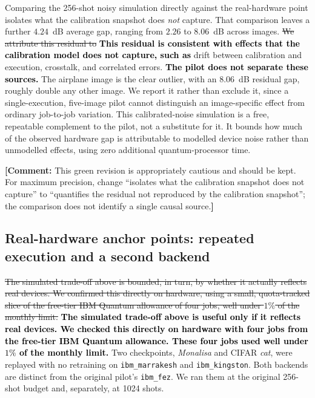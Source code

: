 \documentclass[pdflatex,sn-basic]{sn-jnl}
\newcommand{\del}[1]{\sout{#1}}
\newcommand{\add}[1]{\textbf{\textcolor{black}{#1}}}
\newcommand{\yellowcomment}[1]{%
  \par\smallskip\noindent
  \begingroup\setlength{\fboxsep}{3pt}%
  \colorbox{yellow!35}{\parbox{\dimexpr\linewidth-2\fboxsep\relax}{\textbf{[Comment:} #1\textbf{]}}}%
  \endgroup\par\smallskip}
\begin{document}
Comparing the 256-shot noisy simulation directly against the real-hardware point
isolates what the calibration snapshot does \emph{not} capture. That comparison
leaves a further $4.24$~dB average gap, ranging from $2.26$ to $8.06$~dB across
images. \del{We attribute this residual to} \add{This residual is consistent
with effects that the calibration model does not capture, such as} drift between calibration and execution,
crosstalk, and correlated errors. \add{The pilot does not separate these
sources.} The airplane image is the clear outlier, with
an $8.06$~dB residual gap, roughly double any other image. We report it rather
than exclude it, since a single-execution, five-image pilot cannot distinguish an
image-specific effect from ordinary job-to-job variation. This calibrated-noise
simulation is a free, repeatable complement to the pilot, not a substitute for
it. It bounds how much of the observed hardware gap is attributable to modelled
device noise rather than unmodelled effects, using zero additional
quantum-processor time.
\color{black}
\yellowcomment{This green revision is appropriately cautious and should be kept. For maximum precision, change ``isolates what the calibration snapshot does not capture'' to ``quantifies the residual not reproduced by the calibration snapshot''; the comparison does not identify a single causal source.}


\subsection{Real-hardware anchor points: repeated execution and a second backend}
\label{sec:hardware_anchors}

\del{The simulated trade-off above is bounded, in turn, by whether it actually
reflects real devices. We confirmed this directly on hardware, using a small,
quota-tracked slice of the free-tier IBM Quantum allowance of four jobs, well
under $1\%$ of the monthly limit.} \add{The simulated trade-off above is useful
only if it reflects real devices. We checked this directly on hardware with four
jobs from the free-tier IBM Quantum allowance. These four jobs used well under
$1\%$ of the monthly limit.} Two checkpoints, \textit{Monalisa} and CIFAR
\textit{cat}, were replayed with no retraining on \texttt{ibm\_marrakesh} and
\texttt{ibm\_kingston}. Both backends are distinct from the original pilot's
\texttt{ibm\_fez}. We ran them at the original 256-shot budget and, separately,
at 1024 shots.
\end{document}
